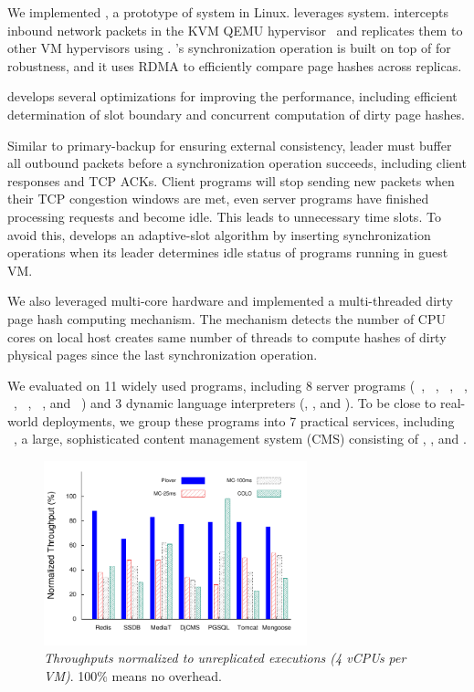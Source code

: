 We implemented \yyy, a prototype of \vsmr system in Linux. \yyy leverages 
\xxx \paxos system. \yyy intercepts inbound network packets in the KVM QEMU 
hypervisor~\cite{qemu} and replicates them to other VM hypervisors using \paxos. 
\yyy's synchronization operation is built on top of \paxos for robustness, and 
it uses RDMA to efficiently compare page hashes across replicas.

\yyy develops several optimizations for improving the performance, including  
efficient determination of slot boundary and concurrent 
computation of dirty page hashes.

Similar to primary-backup for ensuring external consistency, \yyy leader must 
buffer all outbound packets before a synchronization operation succeeds, 
including client responses and TCP ACKs. Client programs will stop sending new 
packets when their TCP congestion windows are met, even server programs have 
finished processing requests and become idle. This leads to unnecessary time 
slots. To avoid this, \yyy develops an adaptive-slot algorithm by inserting 
synchronization operations when its leader determines idle status of programs 
running in guest VM.

We also leveraged multi-core hardware and implemented a multi-threaded dirty 
page hash computing mechanism. The mechanism detects the number of CPU cores on 
local host creates same number of threads to compute hashes of dirty physical 
pages since the last synchronization operation.

We evaluated \yyy on 11 widely used programs, including 8 server programs 
(\redis~\cite{redis}, \ssdb~\cite{ssdb}, \mediatomb~\cite{mediatomb}, 
\nginx~\cite{nginx}, \mysql~\cite{mysql}, \tomcat~\cite{tomcat}, 
\pgsql~\cite{pgsql}, and \mongoose~\cite{mongoose}) and 3 dynamic 
language interpreters (\php, \python, and \jsp). To be close to real-world 
deployments, we group these programs into 7 practical services, 
including \cms~\cite{django:cms}, a large, sophisticated content management 
system (CMS) consisting of \nginx, \python, and \mysql.

\begin{figure}[htbp]
\centering
\includegraphics[width=3in]{figures/FIG1__throughput-overhead}
\caption{{\em Throughputs normalized to unreplicated executions (4 vCPUs per 
VM)}. 100\% means no overhead.}
\label{fig:vmtput}
\end{figure}

